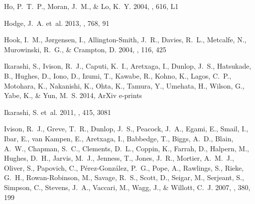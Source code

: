 \documentclass[iop]{emulateapj}
\begin{document}
\begin{thebibliography}{107}
{Ho}, P.~T.~P., {Moran}, J.~M., \& {Lo}, K.~Y. 2004, \apjl, 616, L1

{Hodge}, J.~A. {et~al.} 2013, \apj, 768, 91

{Hook}, I.~M., {J{\o}rgensen}, I., {Allington-Smith}, J.~R., {Davies}, R.~L.,
  {Metcalfe}, N., {Murowinski}, R.~G., \& {Crampton}, D. 2004, \pasp, 116, 425

{Ikarashi}, S., {Ivison}, R.~J., {Caputi}, K.~I., {Aretxaga}, I., {Dunlop},
  J.~S., {Hatsukade}, B., {Hughes}, D., {Iono}, D., {Izumi}, T., {Kawabe}, R.,
  {Kohno}, K., {Lagos}, C.~P., {Motohara}, K., {Nakanishi}, K., {Ohta}, K.,
  {Tamura}, Y., {Umehata}, H., {Wilson}, G., {Yabe}, K., \& {Yun}, M.~S. 2014,
  ArXiv e-prints

{Ikarashi}, S. {et~al.} 2011, \mnras, 415, 3081

{Ivison}, R.~J., {Greve}, T.~R., {Dunlop}, J.~S., {Peacock}, J.~A., {Egami},
  E., {Smail}, I., {Ibar}, E., {van Kampen}, E., {Aretxaga}, I., {Babbedge},
  T., {Biggs}, A.~D., {Blain}, A.~W., {Chapman}, S.~C., {Clements}, D.~L.,
  {Coppin}, K., {Farrah}, D., {Halpern}, M., {Hughes}, D.~H., {Jarvis}, M.~J.,
  {Jenness}, T., {Jones}, J.~R., {Mortier}, A.~M.~J., {Oliver}, S., {Papovich},
  C., {P{\'e}rez-Gonz{\'a}lez}, P.~G., {Pope}, A., {Rawlings}, S., {Rieke},
  G.~H., {Rowan-Robinson}, M., {Savage}, R.~S., {Scott}, D., {Seigar}, M.,
  {Serjeant}, S., {Simpson}, C., {Stevens}, J.~A., {Vaccari}, M., {Wagg}, J.,
  \& {Willott}, C.~J. 2007, \mnras, 380, 199


\end{thebibliography}
\end{document}
